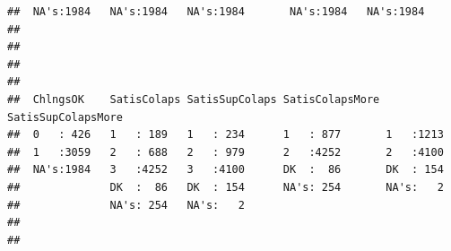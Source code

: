 \documentclass[11pt,]{article}
\begin{document}
\begin{verbatim}
##  NA's:1984   NA's:1984   NA's:1984       NA's:1984   NA's:1984  
##                                                                 
##                                                                 
##                                                                 
##                                                                 
##  ChlngsOK    SatisColaps SatisSupColaps SatisColapsMore SatisSupColapsMore
##  0   : 426   1   : 189   1   : 234      1   : 877       1   :1213         
##  1   :3059   2   : 688   2   : 979      2   :4252       2   :4100         
##  NA's:1984   3   :4252   3   :4100      DK  :  86       DK  : 154         
##              DK  :  86   DK  : 154      NA's: 254       NA's:   2         
##              NA's: 254   NA's:   2                                        
##                                                                           
## 
\end{verbatim}
\end{document}
